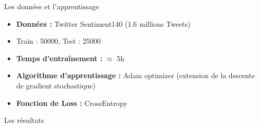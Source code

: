 \documentclass[12pt]{beamer}
\begin{document}

\begin{frame}{Les données et l'apprentissage}

\begin{itemize}
	\item \textbf{Données : } Twitter Sentiment140  (1.6 millions Tweets)
	\item Train : 50000, Test : 25000
	\item \textbf{Temps d'entraînement : } $\approx$ 5h
	\item \textbf{Algorithme d'apprentissage : } Adam optimizer (extension de la descente de gradient stochastique)
	\item \textbf{Fonction de Loss : } CrossEntropy
\end{itemize}

\end{frame}




\begin{frame}{Les résultats}

\begin{center}
\end{center}

\end{frame}



\end{document}

